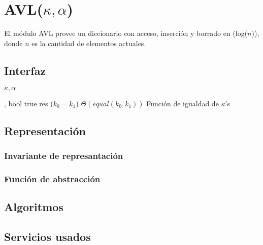 \section{AVL($\kappa, \alpha$)}

El módulo AVL provee un diccionario con acceso, inserción y borrado en \bigo(log($n$)), donde $n$ es la cantidad de elementos actuales.

\subsection{Interfaz}

\begin{iparamformales}{$\kappa, \alpha$}

    \funcion{$\bullet = \bullet$} %
        {, } %
        {bool} %
        {true} %
        {res \igobs ($k_0 = k_1$)} %
        {$\Theta(equal(k_0, k_1))$} %
        {} %
        {Función de igualdad de $\kappa$'s} %

\end{iparamformales}

\iusa{}

\subsection{Representación}

\subsubsection{Invariante de represantación}

\subsubsection{Función de abstracción}

\subsection{Algoritmos}

\subsection{Servicios usados}


